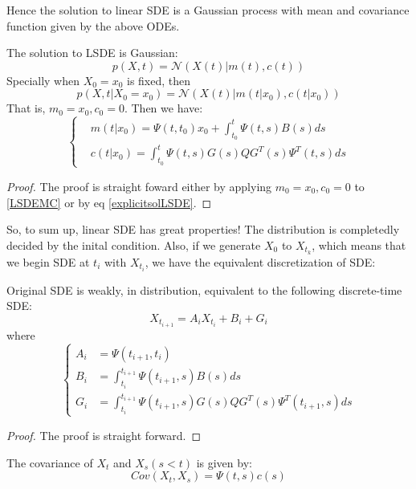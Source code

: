 Hence the solution to linear SDE is a Gaussian process with mean and covariance function given by the above ODEs.
\begin{theorem}
The solution to LSDE is Gaussian:
\begin{equation}
    p(X, t) = \mathcal{N}(X(t)|m(t), c(t))
\end{equation}
Specially when $X_0 = x_0$ is fixed, then 
\begin{equation}\label{transitiondensity}
    p(X,t|X_0=x_0) = \mathcal{N}(X(t)|m(t|x_0), c(t|x_0))
\end{equation}
That is, $m_0 = x_0, c_0 = 0$. Then we have:
\begin{equation}
    \left\{
        \begin{aligned}
            &m(t|x_0) = \Psi(t, t_0)x_0 + \int_{t_0}^t \Psi(t, s)B(s)ds\\
            &c(t|x_0) = \int_{t_0}^t \Psi(t, s)G(s)QG^T(s)\Psi^T(t, s)ds
        \end{aligned}
    \right.
\end{equation}
\end{theorem}
\begin{proof}
    The proof is straight foward either by applying $m_0 = x_0, c_0 = 0$ to \ref{LSDEMC} or by eq \ref{explicitsolLSDE}.
\end{proof}
So, to sum up, linear SDE has great properties! The distribution is completedly decided by the inital condition.
Also, if we generate $X_0$ to $X_{t_k}$, which means that we begin SDE at $t_i$ with $X_{t_i}$, we have the equivalent discretization of SDE:
\begin{theorem}
    Original SDE is weakly, in distribution, equivalent to the following discrete-time SDE:
    \begin{equation}\label{DTSDE}
        X_{t_{i+1}} = A_iX_{t_i} + B_i + G_i
    \end{equation} 
    where
    \begin{equation}\left\{
        \begin{aligned}
            A_i &= \Psi(t_{i+1}, t_i)\\
            B_i &= \int_{t_i}^{t_{i+1}} \Psi(t_{i+1}, s)B(s)ds\\
            G_i &= \int_{t_i}^{t_{i+1}} \Psi(t_{i+1}, s)G(s)QG^T(s)\Psi^T(t_{i+1}, s)ds
        \end{aligned}\right.
    \end{equation}
\end{theorem}
\begin{proof}
    The proof is straight forward.
\end{proof}
\begin{theorem}
    The covariance of $X_t$ and $X_s(s<t)$ is given by:
    \begin{equation}
        Cov(X_t, X_s) = \Psi(t, s)c(s)
    \end{equation}
\end{theorem}

